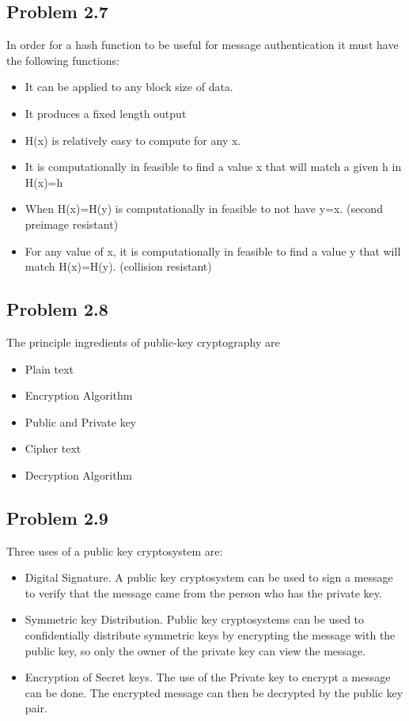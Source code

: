 \documentclass[14pt]{article}
\begin{document}
\subsection{Problem  2.7}
In order for a hash function to be useful for message authentication it must have the following functions:
\begin{itemize}
\item It can be applied to any block size of data.
\item It produces a fixed length output
\item H(x) is relatively easy to compute for any x.
\item It is computationally in feasible to find a value x that will match a given h in H(x)=h
\item When H(x)=H(y) is computationally in feasible to not have y=x. (second preimage resistant)
\item For any value of x, it is computationally in feasible to find a value y that will match H(x)=H(y). (collision resistant)
\end{itemize}

\subsection{Problem  2.8}
The principle ingredients of public-key cryptography are 
\begin{itemize}
\item Plain text
\item Encryption Algorithm
\item Public and Private key
\item Cipher text
\item Decryption Algorithm 
\end{itemize} 

\subsection{Problem  2.9}
Three uses of a public key cryptosystem are:
\begin{itemize}
\item Digital Signature. A public key cryptosystem can be used to sign a message to verify that the message came from the person who has the private key. 
\item Symmetric key Distribution. Public key cryptosystems can be used to confidentially distribute symmetric keys by encrypting the message with the public key, so only the owner of the private key can view the message.
\item Encryption of Secret keys. The use of the Private key to encrypt a message can be done. The encrypted message can then be decrypted by the public key pair.  
\end{itemize}
\end{document}
